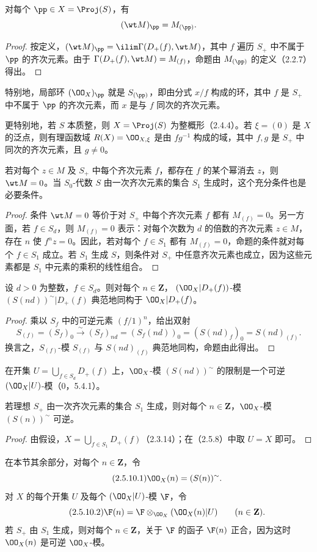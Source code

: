 对每个 $\pp\in X=\Proj(S)$，有
\[
(\wt M)_\pp=M_{(\pp)}.
\]
\begin{proof}
按定义，$(\wt M)_\pp=\ilim\Gamma(D_+(f),\wt M)$，其中 $f$ 遍历 $S_+$ 中不属于 $\pp$ 的齐次元素。由于 $\Gamma(D_+(f),\wt M)=M_{(f)}$，命题由 $M_{(\pp)}$ 的定义（2.2.7）得出。
\end{proof}
特别地，局部环 $(\OO_X)_\pp$ 就是 $S_{(\pp)}$，即由分式 $x/f$ 构成的环，其中 $f$ 是 $S_+$ 中不属于 $\pp$ 的齐次元素，而 $x$ 是与 $f$ 同次的齐次元素。

更特别地，若 $S$ 本质整，则 $X=\Proj(S)$ 为整概形（2.4.4）。若 $\xi=(0)$ 是 $X$ 的泛点，则有理函数域
$R(X)=\OO_{X,\xi}$ 是由 $fg^{-1}$ 构成的域，其中 $f,g$ 是 $S_+$ 中同次的齐次元素，且 $g\ne0$。

若对每个 $z\in M$ 及 $S_+$ 中每个齐次元素 $f$，都存在 $f$ 的某个幂消去 $z$，则 $\wt M=0$。当 $S_0$-代数 $S$ 由一次齐次元素的集合 $S_1$ 生成时，这个充分条件也是必要条件。
\begin{proof}
条件 $\wt M=0$ 等价于对 $S_+$ 中每个齐次元素 $f$ 都有 $M_{(f)}=0$。另一方面，若 $f\in S_d$，则 $M_{(f)}=0$ 表示：对每个次数为 $d$ 的倍数的齐次元素 $z\in M$，存在 $n$ 使 $f^nz=0$。因此，若对每个 $f\in S_1$ 都有 $M_{(f)}=0$，命题的条件就对每个 $f\in S_1$ 成立。若 $S_1$ 生成 $S$，则条件对 $S_+$ 中任意齐次元素也成立，因为这些元素都是 $S_1$ 中元素的乘积的线性组合。
\end{proof}

设 $d>0$ 为整数，$f\in S_d$。则对每个 $n\in\mathbf Z$，
$(\OO_X|D_+(f))$-模 $(S(nd))^\sim|D_+(f)$ 典范地同构于 $\OO_X|D_+(f)$。
\begin{proof}
乘以 $S_f$ 中的可逆元素 $(f/1)^n$，给出双射
\[
S_{(f)}=(S_f)_0\xrightarrow{\sim}(S_f)_{nd}
=(S_f(nd))_0=(S(nd)_f)_0=S(nd)_{(f)}.
\]
换言之，$S_{(f)}$-模 $S_{(f)}$ 与 $S(nd)_{(f)}$ 典范地同构，命题由此得出。
\end{proof}

在开集 $U=\bigcup_{f\in S_d}D_+(f)$ 上，$\OO_X$-模 $(S(nd))^\sim$ 的限制是一个可逆 $(\OO_X|U)$-模（0，5.4.1）。

若理想 $S_+$ 由一次齐次元素的集合 $S_1$ 生成，则对每个 $n\in\mathbf Z$，$\OO_X$-模 $(S(n))^\sim$ 可逆。
\begin{proof}
由假设，$X=\bigcup_{f\in S_1}D_+(f)$（2.3.14）；在（2.5.8）中取 $U=X$ 即可。
\end{proof}

在本节其余部分，对每个 $n\in\mathbf Z$，令
\begin{equation}\tag{2.5.10.1}
\OO_X(n)=(S(n))^\sim.
\end{equation}
对 $X$ 的每个开集 $U$ 及每个 $(\OO_X|U)$-模 $\F$，令
\begin{equation}\tag{2.5.10.2}
\F(n)=\F\otimes_{\OO_X}(\OO_X(n)|U)\qquad(n\in\mathbf Z).
\end{equation}
若 $S_+$ 由 $S_1$ 生成，则对每个 $n\in\mathbf Z$，关于 $\F$ 的函子 $\F(n)$ 正合，因为这时 $\OO_X(n)$ 是可逆 $\OO_X$-模。

